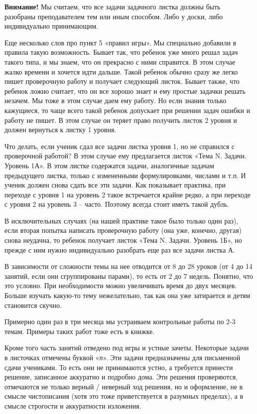 \textbf{Внимание!} Мы считаем, что все задачи задачного листка должны быть разобраны преподавателем тем или иным способом. Либо у доски, либо индивидуально принимающим.

Еще несколько слов про пункт 5 «правил игры». Мы специально добавили в правила такую возможность. Бывает так, что ребенок уже много решал задач такого типа, и мы знаем, что он прекрасно с ними справится. В этом случае жалко времени и хочется идти дальше. Такой ребенок обычно сразу же легко пишет проверочную работу и получает следующий листок. Бывает также, что ребенок ложно считает, что он все хорошо знает и ему простые задачки решать незачем. Мы тоже в этом случае даем ему работу. Но если знания только кажущиеся, то чаще всего такой ребенок допускает при решении задач ошибки и работу не пишет. В этом случае он теряет право получить листок 2 уровня и должен вернуться к листку 1 уровня.

Что делать, если ученик сдал все задачи листка уровня 1, но не справился с проверочной работой? В этом случае ему предлагается листок «Тема N. Задачи. Уровень 1А». В этом листке содержатся задачи, аналогичные задачам предыдущего листка, только с измененными формулировками, числами и т.п. И ученик должен снова сдать все эти задачи. Как показывает практика, при переходе с уровня 1 на уровень 2 такое встречается крайне редко, а при переходе с уровня 2 на уровень 3 – часто. Поэтому всегда стоит иметь такой дубль.

В исключительных случаях (на нашей практике такое было только один раз), если вторая попытка написать проверочную работу (она уже, конечно, другая) снова неудачна, то ребенок получает листок «Тема N. Задачи. Уровень 1Б», но прежде с ним нужно индивидуально разобрать еще раз все задачи листка А.

В зависимости от сложности темы на нее отводится от 8 до 28 уроков (от 4 до 14 занятий, если они сгруппированы парами), то есть от 2 до 7 недель. Понятно, что это условно. При необходимости можно увеличивать время до двух месяцев. Больше изучать какую-то тему нежелательно, так как она уже затирается и детям становится скучно.

Примерно один раз в три месяца мы устраиваем контрольные работы по 2-3 темам. Примеры таких работ тоже есть в книжке.  

Кроме того часть занятий отведено под игры и устные зачеты. Некоторые задачи в листочках отмечены буквой «\textit{п}». Эти задачи предназначены для письменной сдачи учениками. То есть они не принимаются устно, а требуется принести решение, записанное аккуратно и подробно дома. Эти решения проверяются, отмечаются не только верный / неверный ход решения, но и оформление, не в смысле чистописания (хотя это тоже приветствуется в разумных пределах), а в смысле строгости и аккуратности изложения.


